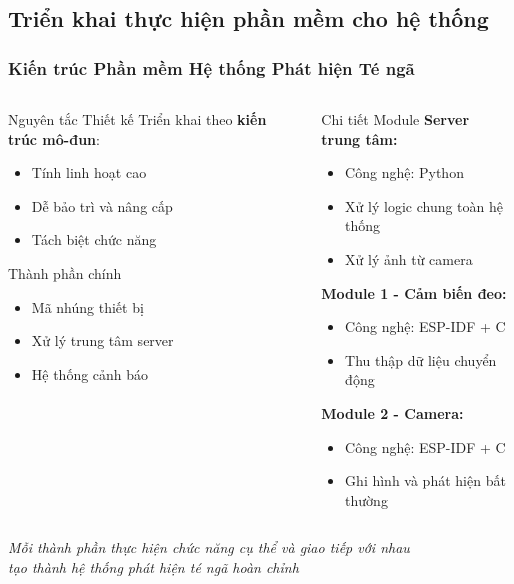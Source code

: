 \subsection{Triển khai thực hiện phần mềm cho hệ thống}
\begin{frame}
\frametitle{Kiến trúc Phần mềm Hệ thống Phát hiện Té ngã}

\begin{columns}[t]
\begin{column}{0.5\textwidth}
\begin{block}{Nguyên tắc Thiết kế}
Triển khai theo \textbf{kiến trúc mô-đun}:
\begin{itemize}
\item Tính linh hoạt cao
\item Dễ bảo trì và nâng cấp
\item Tách biệt chức năng
\end{itemize}
\end{block}

\begin{alertblock}{Thành phần chính}
\begin{itemize}
    \item Mã nhúng thiết bị
    \item Xử lý trung tâm server  
    \item Hệ thống cảnh báo
\end{itemize}
\end{alertblock}
\end{column}

\begin{column}{0.5\textwidth}
\begin{exampleblock}{Chi tiết Module}
\textbf{Server trung tâm:}
\begin{itemize}
\item Công nghệ: Python
\item Xử lý logic chung toàn hệ thống
\item Xử lý ảnh từ camera
\end{itemize}

\textbf{Module 1 - Cảm biến đeo:}
\begin{itemize}
\item Công nghệ: ESP-IDF + C
\item Thu thập dữ liệu chuyển động
\end{itemize}

\textbf{Module 2 - Camera:}
\begin{itemize}
\item Công nghệ: ESP-IDF + C  
\item Ghi hình và phát hiện bất thường
\end{itemize}
\end{exampleblock}
\end{column}
\end{columns}

\vspace{0.3cm}
\begin{center}
\textit{\small Mỗi thành phần thực hiện chức năng cụ thể và giao tiếp với nhau\\tạo thành hệ thống phát hiện té ngã hoàn chỉnh}
\end{center}

\end{frame}

